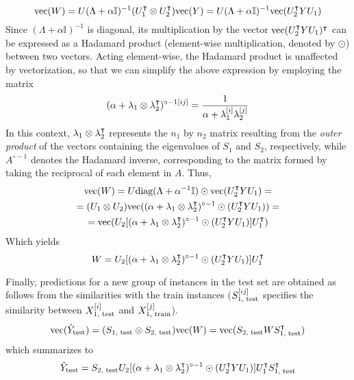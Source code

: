 \begin{apendicesenv}
%
\begin{equation*}
    \text{vec}(W)
    = U (\Lambda + \alpha\mathbb{I})^{-1} (U_1^\intercal \otimes U_2^\intercal) \text{vec}(Y)
    = U (\Lambda + \alpha\mathbb{I})^{-1} \text{vec}(U_2^\intercal Y U_1)
\end{equation*}
%
Since $(\Lambda + \alpha\mathbb{I})^{-1}$ is diagonal, its multiplication by the vector $\text{vec}(U_2^\intercal Y U_1)^\intercal$ can be expressed as a Hadamard product (element-wise multiplication, denoted by $\odot$) between two vectors. Acting element-wise, the Hadamard product is unaffected by vectorization, so that we can simplify the above expression by employing the matrix
%
\begin{equation}
    (\alpha + \mathbf{\lambda}_1 \otimes \mathbf{\lambda}_2^\intercal)^{\circ -1[ij]}
    = \frac{1}{\alpha + \mathbf{\lambda}_1^{[i]} \mathbf{\lambda}_2^{[j]}}
\end{equation}
%
In this context, $\mathbf{\lambda}_1 \otimes \mathbf{\lambda}_2^\intercal$ represents the $n_1$ by $n_2$ matrix resulting from the \emph{outer product} of the vectors containing the eigenvalues of $S_1$ and $S_2$, respectively, while $A^{\circ -1}$ denotes the Hadamard inverse, corresponding to the matrix formed by taking the reciprocal of each element in $A$. Thus,
%
\begin{multline*}
    \text{vec}(W)
    = U \text{diag}(\Lambda + \alpha^{-1}\mathbb{I}) \odot \text{vec}(U_2^\intercal Y U_1)
    =\\
    = (U_1 \otimes U_2) \text{vec}(
        (\alpha + \mathbf{\lambda}_1 \otimes \mathbf{\lambda}_2^\intercal)^{\circ -1}
        \odot (U_2^\intercal Y U_1)
    )
    =\\
    = \text{vec}(
        U_2
        [
            (\alpha + \mathbf{\lambda}_1 \otimes \mathbf{\lambda}_2^\intercal)^{\circ -1}
            \odot (U_2^\intercal Y U_1)
        ]
        U_1^\intercal
    )
\end{multline*}
%
Which yields
%
\begin{equation}
    W = 
        U_2
        [
            (\alpha + \mathbf{\lambda}_1 \otimes \mathbf{\lambda}_2^\intercal)^{\circ -1}
            \odot (U_2^\intercal Y U_1)
        ]
        U_1^\intercal
\end{equation}

Finally, predictions for a new group of instances in the test set are obtained as follows from the similarities with the train instances ($S_\text{1, test}^{[ij]}$ specifies the similarity between $X_\text{1, test}^{[i]}$ and $X_\text{1, train}^{[j]}$).
%
\begin{equation}
    \text{vec}(\hat Y_\text{test})
    = (S_\text{1, test} \otimes S_\text{2, test}) \text{vec}(W)
    = \text{vec}(S_\text{2, test} W S_\text{1, test}^\intercal)
\end{equation}
%
which summarizes to
%
\begin{equation}
    \hat Y_\text{test} =
        S_\text{2, test}
        U_2
        [
            (\alpha + \mathbf{\lambda}_1 \otimes \mathbf{\lambda}_2^\intercal)^{\circ -1}
            \odot (U_2^\intercal Y U_1)
        ]
        U_1^\intercal
        S_\text{1, test}^\intercal
\end{equation}


\end{apendicesenv}
